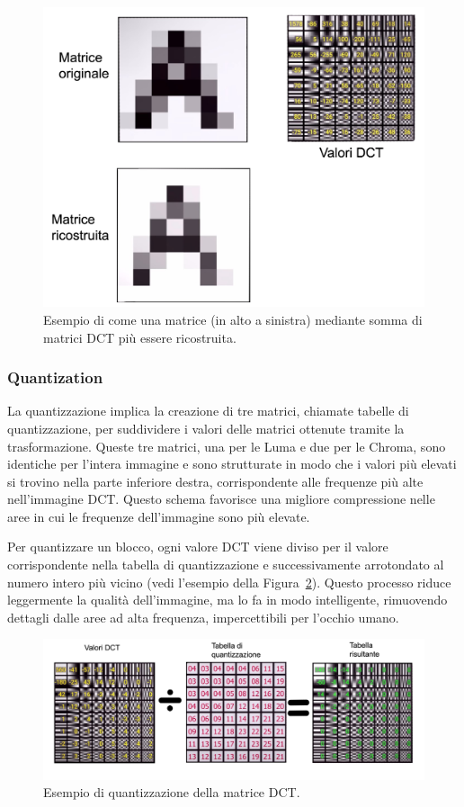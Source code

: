 \documentclass[a4paper,12pt, oneside]{article}
\begin{document}
\begin{figure}[h]
    \centering
    \includegraphics[width=1\textwidth]{images/DCT-example.png}
    \caption{Esempio di come una matrice (in alto a sinistra) mediante somma di matrici DCT
    più essere ricostruita.}
    \label{fig:DCT_example}
\end{figure}

\subsubsection{Quantization}
La quantizzazione implica la creazione di tre matrici, chiamate tabelle di quantizzazione, per
suddividere i valori delle matrici ottenute tramite la trasformazione. Queste tre matrici, una
per le Luma e due per le Chroma, sono identiche per l'intera immagine e sono strutturate in
modo che i valori più elevati si trovino nella parte inferiore destra, corrispondente alle
frequenze più alte nell'immagine DCT. Questo schema favorisce una migliore compressione nelle
aree in cui le frequenze dell'immagine sono più elevate.

Per quantizzare un blocco, ogni valore DCT viene diviso per il valore corrispondente nella
tabella di quantizzazione e successivamente arrotondato al numero intero più vicino (vedi
l'esempio della Figura~\ref{fig:quantization_example}). Questo processo riduce leggermente la
qualità dell'immagine, ma lo fa in modo intelligente, rimuovendo dettagli dalle aree ad alta
frequenza, impercettibili per l'occhio umano.

\begin{figure}[h]
    \centering
    \includegraphics[width=1\textwidth]{images/quantization-example.png}
    \caption{Esempio di quantizzazione della matrice DCT.}
    \label{fig:quantization_example}
\end{figure}
\end{document}
